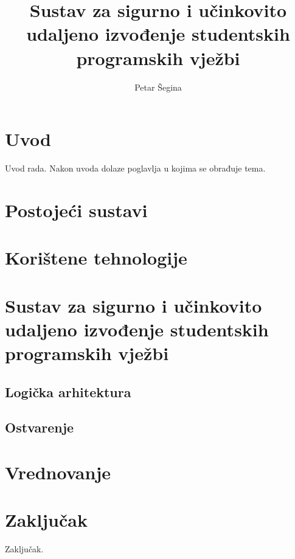 \documentclass[times, utf8, zavrsni]{fer}
\begin{document}

\title{Sustav za sigurno i učinkovito udaljeno izvođenje studentskih programskih vježbi}

\author{Petar Šegina}

\maketitle

\izvornik

\zahvala{}

\tableofcontents

\chapter{Uvod}
Uvod rada. Nakon uvoda dolaze poglavlja u kojima se obrađuje tema.

\chapter{Postojeći sustavi}

\chapter{Korištene tehnologije}

\chapter{Sustav za sigurno i učinkovito udaljeno izvođenje studentskih programskih vježbi}

\section{Logička arhitektura}

\section{Ostvarenje}

\chapter{Vrednovanje}

\chapter{Zaključak}
Zaključak.
\end{document}
